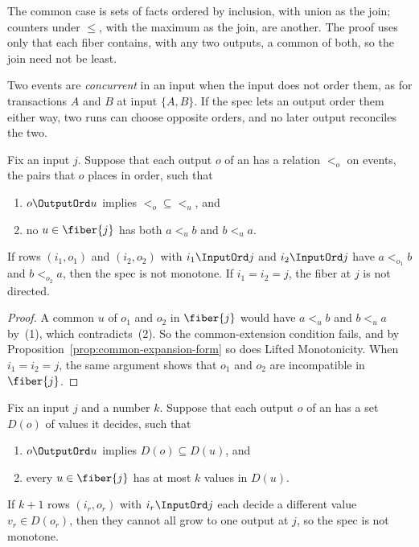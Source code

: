The common case is sets of facts ordered by inclusion, with union as the join;
counters under $\leq$, with the maximum as the join, are another.  The proof
uses only that each fiber contains, with any two outputs, a common \outnoun of
both, so the join need not be least.

Two events are \emph{concurrent} in an input when the input does not order
them, as for transactions $A$ and $B$ at input $\{A,B\}$.  If the spec lets an
output order them either way, two runs can choose opposite orders, and no
later output reconciles the two.

\begin{lemma}
\label{lem:order-commitment}
Fix an input $j$.  Suppose that each output $o$ of an \spectype has a relation
$<_o$ on events, the pairs that $o$ places in order, such that
\begin{enumerate}
  \item $o\OutputOrd u$ implies ${<_o}\subseteq{<_u}$, and
  \item no $u\in\fiber{j}$ has both $a<_u b$ and $b<_u a$.
\end{enumerate}
If rows $(i_1,o_1)$ and $(i_2,o_2)$ with $i_1\InputOrd j$ and $i_2\InputOrd j$
have $a<_{o_1}b$ and $b<_{o_2}a$, then the spec is not monotone.  If
$i_1=i_2=j$, the fiber at $j$ is not directed.
\end{lemma}

\begin{proof}
A common \outnoun $u$ of $o_1$ and $o_2$ in $\fiber{j}$ would have $a<_u b$
and $b<_u a$ by~(1), which contradicts~(2).  So the common-extension condition
fails, and by Proposition~\ref{prop:common-expansion-form} so does Lifted
Monotonicity.  When $i_1=i_2=j$, the same argument shows that $o_1$ and $o_2$
are incompatible in $\fiber{j}$.
\end{proof}

\begin{lemma}
\label{lem:bounded-values}
Fix an input $j$ and a number $k$.  Suppose that each output $o$ of an
\spectype has a set $D(o)$ of values it decides, such that
\begin{enumerate}
  \item $o\OutputOrd u$ implies $D(o)\subseteq D(u)$, and
  \item every $u\in\fiber{j}$ has at most $k$ values in $D(u)$.
\end{enumerate}
If $k+1$ rows $(i_r,o_r)$ with $i_r\InputOrd j$ each decide a different value
$v_r\in D(o_r)$, then they cannot all grow to one output at $j$, so the spec is
not monotone.
\end{lemma}

